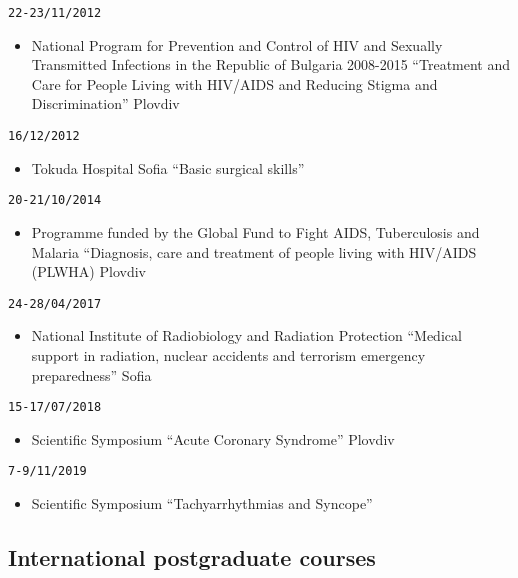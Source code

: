 \documentclass[
  12pt,
  letterpaper,
  DIV=11,
  numbers=noendperiod]{scrartcl}
\providecommand{\tightlist}{%
  \setlength{\itemsep}{0pt}\setlength{\parskip}{0pt}}\usepackage{longtable,booktabs,array}
\begin{document}
\texttt{22-23/11/2012}

\begin{itemize}
\tightlist
\item
  National Program for Prevention and Control of HIV and Sexually
  Transmitted Infections in the Republic of Bulgaria 2008-2015
  \textbar{} ``Treatment and Care for People Living with HIV/AIDS and
  Reducing Stigma and Discrimination'' \textbar{} Plovdiv
\end{itemize}

\texttt{16/12/2012}

\begin{itemize}
\tightlist
\item
  Tokuda Hospital Sofia \textbar{} ``Basic surgical skills''
\end{itemize}

\texttt{20-21/10/2014}

\begin{itemize}
\tightlist
\item
  Programme funded by the Global Fund to Fight AIDS, Tuberculosis and
  Malaria \textbar{} ``Diagnosis, care and treatment of people living
  with HIV/AIDS (PLWHA) \textbar{} Plovdiv
\end{itemize}

\texttt{24-28/04/2017}

\begin{itemize}
\tightlist
\item
  National Institute of Radiobiology and Radiation Protection \textbar{}
  ``Medical support in radiation, nuclear accidents and terrorism
  emergency preparedness'' \textbar{} Sofia
\end{itemize}

\texttt{15-17/07/2018}

\begin{itemize}
\tightlist
\item
  Scientific Symposium \textbar{} ``Acute Coronary Syndrome'' \textbar{}
  Plovdiv
\end{itemize}

\texttt{7-9/11/2019}

\begin{itemize}
\tightlist
\item
  Scientific Symposium \textbar{} ``Tachyarrhythmias and Syncope''
\end{itemize}

\subsection{International postgraduate
courses}\label{international-postgraduate-courses}
\end{document}
